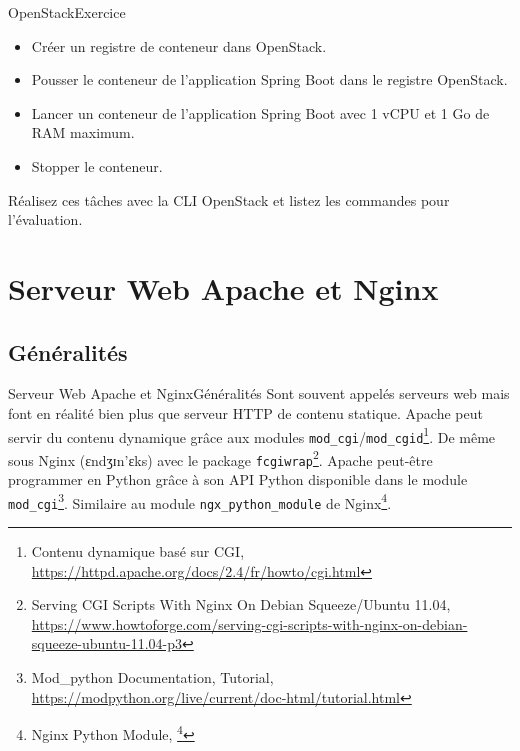 \documentclass{beamer}
\begin{document}
    \begin{frame}{OpenStack}{Exercice \execcounterdispinc{}}
        \begin{itemize}
            \item Créer un registre de conteneur dans OpenStack.
            \item Pousser le conteneur de l'application Spring Boot dans le registre OpenStack.
            \item Lancer un conteneur de l'application Spring Boot avec 1 vCPU et 1 Go de RAM maximum.
            \item Stopper le conteneur.
        \end{itemize}
        Réalisez ces tâches avec la CLI OpenStack et listez les commandes pour l'évaluation.
    \end{frame}


    \section{Serveur Web Apache et Nginx}\label{sec:serveur-web-apache-et-nginx}

    \subsection{Généralités}\label{subsec:generalites}
    \begin{frame}{Serveur Web Apache et Nginx}{Généralités}
        Sont souvent appelés serveurs web mais font en réalité bien plus que serveur HTTP de contenu statique.
        \bigbreak
        Apache peut servir du contenu dynamique grâce aux modules \lstinline{mod_cgi}/\lstinline{mod_cgid}\footnote{Contenu dynamique basé sur CGI, \url{https://httpd.apache.org/docs/2.4/fr/howto/cgi.html}}.
        De même sous Nginx (ɛndʒɪn'ɛks) avec le package \lstinline{fcgiwrap}\footnote{Serving CGI Scripts With Nginx On Debian Squeeze/Ubuntu 11.04, \url{https://www.howtoforge.com/serving-cgi-scripts-with-nginx-on-debian-squeeze-ubuntu-11.04-p3}}.
        \bigbreak
        Apache peut-être programmer en Python grâce à son API Python disponible dans le module \lstinline{mod_cgi}\footnote{Mod\_python Documentation, Tutorial, \url{https://modpython.org/live/current/doc-html/tutorial.html}}.
        Similaire au module \lstinline{ngx_python_module} de Nginx\footnote{Nginx Python Module, \footnote{Nginx Python Module, \url{https://github.com/arut/nginx-python-module}}}.
        \setlength\parindent{0pt}
    \end{frame}
\end{document}
